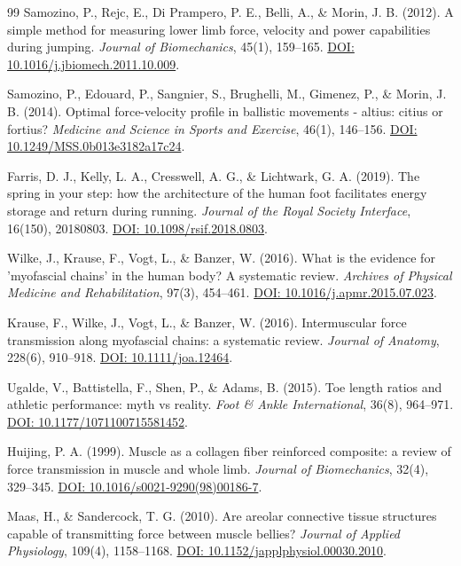 \documentclass[11pt,a4paper]{article}
\begin{document}
\begin{thebibliography}{99}
Samozino, P., Rejc, E., Di Prampero, P. E., Belli, A., \& Morin, J. B. (2012). A simple method for measuring lower limb force, velocity and power capabilities during jumping. \textit{Journal of Biomechanics}, 45(1), 159--165. \href{https://doi.org/10.1016/j.jbiomech.2011.10.009}{DOI: 10.1016/j.jbiomech.2011.10.009}.

Samozino, P., Edouard, P., Sangnier, S., Brughelli, M., Gimenez, P., \& Morin, J. B. (2014). Optimal force-velocity profile in ballistic movements - altius: citius or fortius? \textit{Medicine and Science in Sports and Exercise}, 46(1), 146--156. \href{https://doi.org/10.1249/MSS.0b013e3182a17c24}{DOI: 10.1249/MSS.0b013e3182a17c24}.

Farris, D. J., Kelly, L. A., Cresswell, A. G., \& Lichtwark, G. A. (2019). The spring in your step: how the architecture of the human foot facilitates energy storage and return during running. \textit{Journal of the Royal Society Interface}, 16(150), 20180803. \href{https://doi.org/10.1098/rsif.2018.0803}{DOI: 10.1098/rsif.2018.0803}.

Wilke, J., Krause, F., Vogt, L., \& Banzer, W. (2016). What is the evidence for 'myofascial chains' in the human body? A systematic review. \textit{Archives of Physical Medicine and Rehabilitation}, 97(3), 454--461. \href{https://doi.org/10.1016/j.apmr.2015.07.023}{DOI: 10.1016/j.apmr.2015.07.023}.

Krause, F., Wilke, J., Vogt, L., \& Banzer, W. (2016). Intermuscular force transmission along myofascial chains: a systematic review. \textit{Journal of Anatomy}, 228(6), 910--918. \href{https://doi.org/10.1111/joa.12464}{DOI: 10.1111/joa.12464}.

Ugalde, V., Battistella, F., Shen, P., \& Adams, B. (2015). Toe length ratios and athletic performance: myth vs reality. \textit{Foot \& Ankle International}, 36(8), 964--971. \href{https://doi.org/10.1177/1071100715581452}{DOI: 10.1177/1071100715581452}.

Huijing, P. A. (1999). Muscle as a collagen fiber reinforced composite: a review of force transmission in muscle and whole limb. \textit{Journal of Biomechanics}, 32(4), 329--345. \href{https://doi.org/10.1016/s0021-9290(98)00186-7}{DOI: 10.1016/s0021-9290(98)00186-7}.

Maas, H., \& Sandercock, T. G. (2010). Are areolar connective tissue structures capable of transmitting force between muscle bellies? \textit{Journal of Applied Physiology}, 109(4), 1158--1168. \href{https://doi.org/10.1152/japplphysiol.00030.2010}{DOI: 10.1152/japplphysiol.00030.2010}.


\end{thebibliography}
\end{document}
